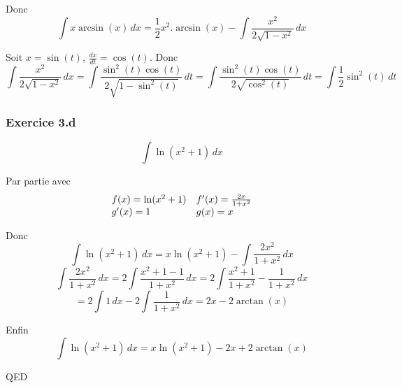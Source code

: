 \documentclass[]{book}
\theoremstyle{definition}
\begin{document}
Donc
$$\int{x\arcsin(x)\,dx} = \frac{1}{2}x^{2}.\arcsin(x) - \int{\frac{x^2}{2\sqrt{1-x^2}}\,dx}$$

Soit $x = \sin(t)$, $\frac{dx}{dt}=\cos(t)$.
Donc
$$\int{\frac{x^2}{2\sqrt{1-x^2}}\,dx} = \int{\frac{\sin^2(t)\cos(t)}{2\sqrt{1-\sin^2(t)}}\,dt} = \int{\frac{\sin^2(t)\cos(t)}{2\sqrt{\cos^2(t)}}\,dt} = \int{\frac{1}{2}\sin^2(t)\,dt}$$

\subsubsection*{Exercice 3.d}
$$\int{\ln(x^2+1)\,dx}$$

Par partie avec
$$
\begin{array}{l l}
f(x) = \ln(x^2+1) & f'(x)=\frac{2x}{1+x^2} \\
g'(x)= 1 & g(x) = x \\
\end{array}
$$

Donc
$$\int{\ln(x^2+1)\,dx} = x\ln(x^2+1) - \int{\frac{2x^2}{1+x^2}\,dx}$$
$$\int{\frac{2x^2}{1+x^2}\,dx} = 2\int{\frac{x^2+1-1}{1+x^2}\,dx} = 2\int{\frac{x^2+1}{1+x^2}-\frac{1}{1+x^2}\,dx}$$
$$=2\int{1\,dx}-2\int{\frac{1}{1+x^2}\,dx} = 2x - 2\arctan(x)$$

Enfin
$$\int{\ln(x^2+1)\,dx} = x\ln(x^2+1) - 2x + 2\arctan(x)$$


QED
\end{document}
